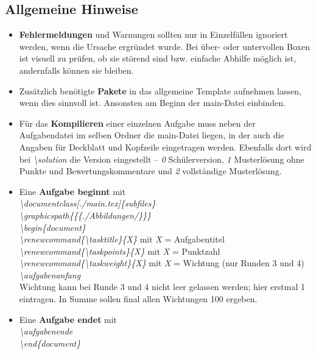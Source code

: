 \documentclass[./main.tex]{subfiles}
\begin{document}
\subsection{Allgemeine Hinweise}
\begin{itemize}
    \item \textbf{Fehlermeldungen} und Warnungen sollten nur in Einzelf\"allen ignoriert werden, wenn die Ursache ergr\"undet wurde. Bei \"uber- oder untervollen Boxen ist visuell zu pr\"ufen, ob sie st\"orend sind bzw. einfache Abhilfe m\"oglich ist, andernfalls k\"onnen sie bleiben. 
    \item Zus\"atzlich ben\"otigte \textbf{Pakete} in das allgemeine Template aufnehmen lassen, wenn dies sinnvoll ist. Ansonsten am Beginn der main-Datei einbinden. 
    \item F\"ur das \textbf{Kompilieren} einer einzelnen Aufgabe muss neben der Aufgabendatei im selben Ordner die main-Datei liegen, in der auch die Angaben f\"ur Deckblatt und Kopfzeile eingetragen werden. Ebenfalls dort wird bei \hypertarget{solution}{\textit{\textbackslash solution}} die Version eingestellt -- \textit{0} Sch\"ulerversion, \textit{1} Musterl\"osung ohne Punkte und Bewertungskommentare und \textit{2} vollst\"andige Musterl\"osung. 
    \item Eine \textbf{Aufgabe beginnt} mit \\\textit{\textbackslash documentclass[./main.tex]\{subfiles\}\\\textbackslash graphicspath\{\{\subfix\{./Abbildungen/\}\}\}\\\textbackslash begin\{document\}\\\textbackslash renewcommand\{\textbackslash tasktitle\}\{X\}} mit \textit{X} = Aufgabentitel\\\textit{\textbackslash renewcommand\{\textbackslash taskpoints\}\{X\}} mit \textit{X} = Punktzahl\\\textit{\textbackslash renewcommand\{\textbackslash taskweight\}\{X\}} mit \textit{X} = Wichtung (nur Runden 3 und 4)\\
    \textit{\hypertarget{aufgabenanfang}{\textbackslash aufgabenanfang}}\\
    Wichtung kann bei Runde 3 und 4 nicht leer gelassen werden; hier erstmal 1 eintragen. In Summe sollen final allen Wichtungen 100 ergeben.
    \item Eine \textbf{Aufgabe endet} mit \\
    \textit{\hypertarget{aufgabenende}{\textbackslash aufgabenende}}\\\textit{\textbackslash end\{document\}}

\end{itemize}
\end{document}
